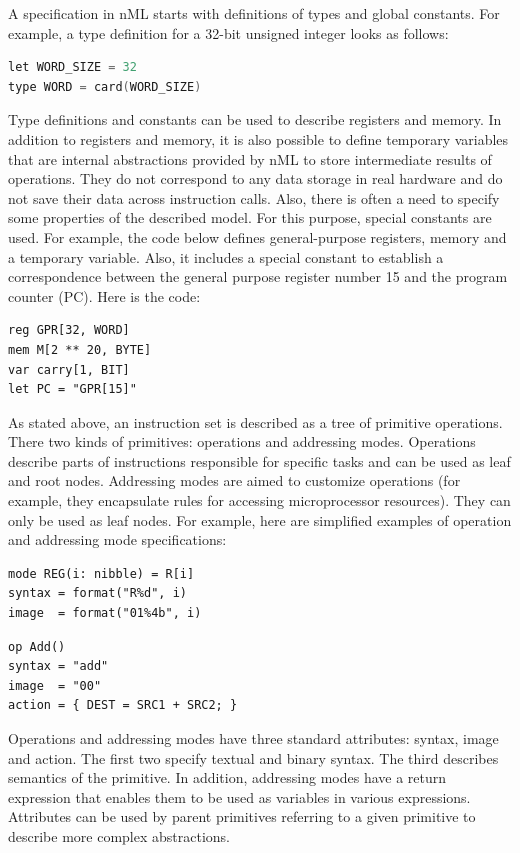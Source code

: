 A specification in nML starts with definitions of types and global constants.
For example, a type definition for a 32-bit unsigned integer looks as follows:

\begin{lstlisting}[language=C]
let WORD_SIZE = 32
type WORD = card(WORD_SIZE)
\end{lstlisting}

Type definitions and constants can be used to describe registers and memory.
In addition to registers and memory, it is also possible to define temporary
variables that are internal abstractions provided by nML to store intermediate
results of operations. They do not correspond to any data storage in real
hardware and do not save their data across instruction calls. Also, there is
often a need to specify some properties of the described model. For this
purpose, special constants are used. For example, the code below defines
general-purpose registers, memory and a temporary variable. Also, it includes
a special constant to establish a correspondence between the general purpose
register number 15 and the program counter (PC). Here is the code:

\begin{lstlisting}
reg GPR[32, WORD]
mem M[2 ** 20, BYTE]
var carry[1, BIT]
let PC = "GPR[15]"
\end{lstlisting}

As stated above, an instruction set is described as a tree of primitive
operations. There two kinds of primitives: operations and addressing modes.
Operations describe parts of instructions responsible for specific tasks and
can be used as leaf and root nodes. Addressing modes are aimed to customize
operations (for example, they encapsulate rules for accessing microprocessor
resources). They can only be used as leaf nodes. For example, here are
simplified examples of operation and addressing mode specifications:

\begin{lstlisting}
mode REG(i: nibble) = R[i]
syntax = format("R%d", i)
image  = format("01%4b", i)
\end{lstlisting}

\begin{lstlisting}
op Add()
syntax = "add" 
image  = "00" 
action = { DEST = SRC1 + SRC2; }
\end{lstlisting}

Operations and addressing modes have three standard attributes: syntax, image
and action. The first two specify textual and binary syntax. The third
describes semantics of the primitive. In addition, addressing modes have
a return expression that enables them to be used as variables in various
expressions. Attributes can be used by parent primitives referring to a given
primitive to describe more complex abstractions.

